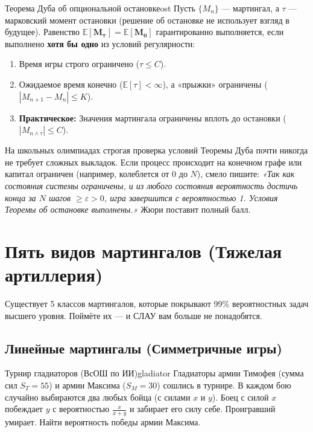 \documentclass[12pt,a4paper]{article}
\renewcommand{\ge}{\geqslant}
\renewcommand{\le}{\leqslant}
\newcommand{\E}{\mathbb{E}}
\begin{document}
\begin{theorem}{Теорема Дуба об опциональной остановке}{ost}
Пусть $\{M_n\}$ --- мартингал, а $\tau$ --- марковский момент остановки (решение об остановке не использует взгляд в будущее). Равенство $\mathbf{\E[M_\tau] = \E[M_0]}$ гарантированно выполняется, если выполнено \textbf{хотя бы одно} из условий регулярности:
\begin{enumerate}
    \item Время игры строго ограничено ($\tau \le C$).
    \item Ожидаемое время конечно ($\E[\tau] < \infty$), а «прыжки» ограничены ($|M_{n+1} - M_n| \le K$).
    \item \textbf{Практическое:} Значения мартингала ограничены вплоть до остановки ($|M_{n \wedge \tau}| \le C$).
\end{enumerate}
\end{theorem}

\begin{insight}
На школьных олимпиадах строгая проверка условий Теоремы Дуба почти никогда не требует сложных выкладок. Если процесс происходит на конечном графе или капитал ограничен (например, колеблется от $0$ до $N$), смело пишите: 
\textit{«Так как состояния системы ограничены, и из любого состояния вероятность достичь конца за $N$ шагов $\ge \varepsilon > 0$, игра завершится с вероятностью 1. Условия Теоремы об остановке выполнены.»} Жюри поставит полный балл.
\end{insight}

\section{Пять видов мартингалов (Тяжелая артиллерия)}

Существует 5 классов мартингалов, которые покрывают 99\% вероятностных задач высшего уровня. Поймёте их — и СЛАУ вам больше не понадобятся.

\subsection{Линейные мартингалы (Симметричные игры)}

\begin{problem}{Турнир гладиаторов (ВсОШ по ИИ)}{gladiator}
Гладиаторы армии Тимофея (сумма сил $S_T = 55$) и армии Максима ($S_M = 30$) сошлись в турнире. В каждом бою случайно выбираются два любых бойца (с силами $x$ и $y$). Боец с силой $x$ побеждает $y$ с вероятностью $\frac{x}{x+y}$ и забирает его силу себе. Проигравший умирает. Найти вероятность победы армии Максима.
\end{problem}
\end{document}
